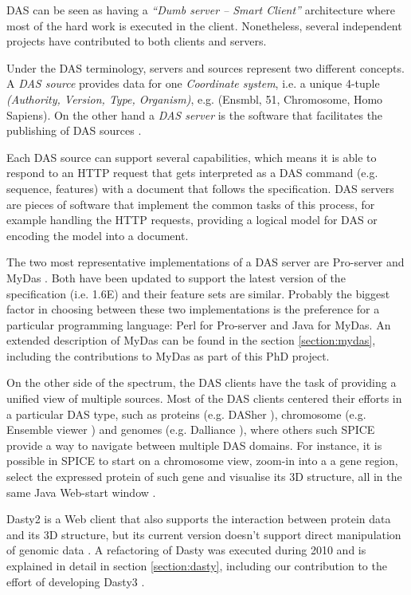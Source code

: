 DAS can be seen as having a \emph{``Dumb server -- Smart Client''} architecture where most of the hard work is executed in the client. Nonetheless, several independent projects have contributed to both clients and servers. 

Under the DAS terminology, servers and sources represent two different concepts. A \emph{DAS source} provides data for one \emph{Coordinate system}, i.e. a unique 4-tuple \emph{(Authority, Version, Type, Organism)}, e.g. (Ensmbl, 51, Chromosome, Homo Sapiens). On the other hand a \emph{DAS server} is the software that facilitates the publishing of DAS sources \cite{DASCS2009}.

Each DAS source can support several capabilities, which means it is able to respond to an HTTP request that gets interpreted as a DAS command (e.g. sequence, features) with a document that follows the specification. DAS servers are pieces of software that implement the common tasks of this process, for example handling the HTTP requests, providing a logical model for DAS or encoding the model into a document.

The two most representative implementations of a DAS server are Pro-server \cite{FIN2007} and MyDas \cite{SAL2012}. Both have been updated to support the latest version of the specification (i.e. 1.6E) and their feature sets are similar. Probably the biggest factor in choosing between these two implementations is the preference for a particular programming language: Perl for Pro-server and Java for MyDas. An extended description of MyDas can be found in the section \ref{section:mydas}, including the contributions to MyDas as part of this PhD project.

On the other side of the spectrum, the DAS clients have the task of providing a unified view of multiple sources. Most of the DAS clients centered their efforts in a particular DAS type, such as proteins (e.g. DASher \cite{MES2009}), chromosome (e.g. Ensemble viewer \cite{FLI2011}) and genomes (e.g. Dalliance \cite{DOW2011}), where others such SPICE provide a way to navigate between multiple DAS domains. For instance, it is possible in SPICE to start on a chromosome view, zoom-in into a a gene region, select the expressed protein of such gene and visualise its 3D structure, all in the same Java Web-start window \cite{PRL2005}.

Dasty2 is a Web client that also supports the interaction between protein data and its 3D structure, but its current version doesn't support direct manipulation of genomic data \cite{JIM2008}. A refactoring of Dasty was executed during 2010 and is explained in detail in section \ref{section:dasty}, including our contribution to the effort of developing Dasty3 \cite{VIL2011}. 

